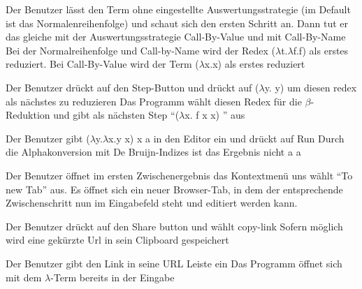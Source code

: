 \documentclass[parskip=full,11pt,twoside]{scrartcl}
\begin{document}

{Der Benutzer lässt den Term ohne eingestellte Auswertungsstrategie (im Default ist das Normalenreihenfolge) und schaut sich den ersten Schritt an. Dann tut er das gleiche mit der Auswertungsstrategie Call-By-Value und  mit Call-By-Name}
{ Bei der Normalreihenfolge und Call-by-Name wird der Redex ($\lambda$t.$\lambda$f.f) als erstes reduziert. Bei Call-By-Value wird der Term ($\lambda$x.x) als erstes reduziert }

{Der Benutzer drückt auf den Step-Button und drückt auf ($\lambda$y. y) um diesen redex als nächstes zu reduzieren}
{Das Programm wählt diesen Redex für die $\beta$-Reduktion und gibt als nächsten Step \enquote{($\lambda$x. f x x) } aus  }


{ Der Benutzer gibt ($\lambda$y.$\lambda$x.y x) x a in den Editor ein und drückt auf Run}
{ Durch die Alphakonversion mit De Bruijn-Indizes ist das Ergebnis nicht a  a  }


{Der Benutzer öffnet im ersten Zwischenergebnis das Kontextmenü uns wählt \enquote{To new Tab} aus.}
{Es öffnet sich ein neuer Browser-Tab, in dem der entsprechende Zwischenschritt nun im Eingabefeld steht und editiert werden kann.}

{ Der Benutzer drückt auf den Share button und wählt copy-link}
{ Sofern möglich wird eine gekürzte Url in sein Clipboard gespeichert }

{Der Benutzer gibt den Link in seine URL Leiste ein }
{ Das Programm öffnet sich mit dem $\lambda$-Term bereits in der Eingabe }
\end{document}
